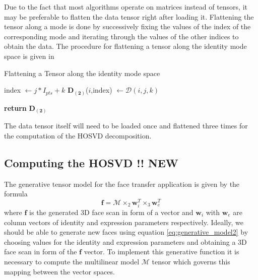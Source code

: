 \documentclass[11pt,a4paper]{report}
\begin{document}
Due to the fact that most algorithms operate on matrices instead of tensors, it
may be preferable to flatten the data tensor right after loading it. Flattening
the tensor along a mode is done by successively fixing the values of the index of
the corresponding mode and iterating through the values of the other indices to
obtain the data. The procedure for flattening a tensor along the identity mode
space is given in 

\begin{algorithm}
\caption{Flattening a Tensor along the identity mode space}
\begin{algorithmic}[1]
 


\State index $\gets j*I_{pts} + k$
\State $\mathbf{D_{(2)}}$($i$,index) $\gets \mathcal{D}(i,j,k)$

\EndFor
\EndFor
\EndFor
\State \textbf{return} $\mathbf{D_{(2)}}$ 
\EndProcedure
\end{algorithmic}
\end{algorithm}

The data tensor itself will need to be loaded once and flattened three times for
the computation of the HOSVD decomposition.

\subsection{Computing the HOSVD !! NEW}\label{s:hosvd}
The generative tensor model for the face transfer application is given by the formula 
\begin{equation} \label{eq:generative_model2}
\mathbf{f} = \mathcal{M} \times_2 \mathbf{w}_i^T \times_3 \mathbf{w}_e^T
\end{equation}
where $\mathbf{f}$ is the generated 3D face scan in form of a vector and
$\mathbf{w}_i$ with $\mathbf{w}_e$ are column vectors of identity and expression
parameters respectively. Ideally, we should be able to generate new faces using
equation \ref{eq:generative_model2} by choosing values for the identity and
expression parameters and obtaining a 3D face scan in form of the $\mathbf{f}$
vector. To implement this generative function it is necessary to compute the multilinear model
$\mathcal{M}$ tensor which governs this mapping between the vector spaces.
\end{document}
